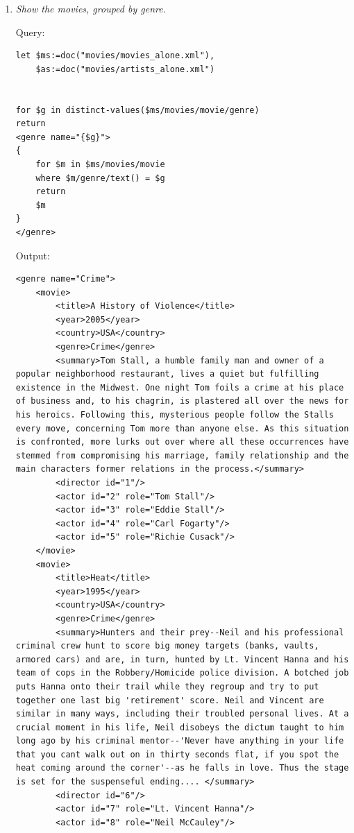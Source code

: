 \documentclass[a4paper, notitlepage]{article}
\begin{document}
\begin{enumerate}
\item  
  \emph{Show the movies, grouped by genre.} 
  
Query: 
  
\begin{lstlisting}
let $ms:=doc("movies/movies_alone.xml"),
    $as:=doc("movies/artists_alone.xml")
    
    
for $g in distinct-values($ms/movies/movie/genre)
return 
<genre name="{$g}">  
{
    for $m in $ms/movies/movie
    where $m/genre/text() = $g
    return 
    $m
}
</genre>
\end{lstlisting}
  
Output:
  
\begin{lstlisting}
<genre name="Crime">
	<movie>
		<title>A History of Violence</title>
		<year>2005</year>
		<country>USA</country>
		<genre>Crime</genre>
		<summary>Tom Stall, a humble family man and owner of a popular neighborhood restaurant, lives a quiet but fulfilling existence in the Midwest. One night Tom foils a crime at his place of business and, to his chagrin, is plastered all over the news for his heroics. Following this, mysterious people follow the Stalls every move, concerning Tom more than anyone else. As this situation is confronted, more lurks out over where all these occurrences have stemmed from compromising his marriage, family relationship and the main characters former relations in the process.</summary>
		<director id="1"/>
		<actor id="2" role="Tom Stall"/>
		<actor id="3" role="Eddie Stall"/>
		<actor id="4" role="Carl Fogarty"/>
		<actor id="5" role="Richie Cusack"/>
	</movie>
	<movie>
		<title>Heat</title>
		<year>1995</year>
		<country>USA</country>
		<genre>Crime</genre>
		<summary>Hunters and their prey--Neil and his professional criminal crew hunt to score big money targets (banks, vaults, armored cars) and are, in turn, hunted by Lt. Vincent Hanna and his team of cops in the Robbery/Homicide police division. A botched job puts Hanna onto their trail while they regroup and try to put together one last big 'retirement' score. Neil and Vincent are similar in many ways, including their troubled personal lives. At a crucial moment in his life, Neil disobeys the dictum taught to him long ago by his criminal mentor--'Never have anything in your life that you cant walk out on in thirty seconds flat, if you spot the heat coming around the corner'--as he falls in love. Thus the stage is set for the suspenseful ending.... </summary>
		<director id="6"/>
		<actor id="7" role="Lt. Vincent Hanna"/>
		<actor id="8" role="Neil McCauley"/>

\end{lstlisting}
\end{enumerate}
\end{document}
